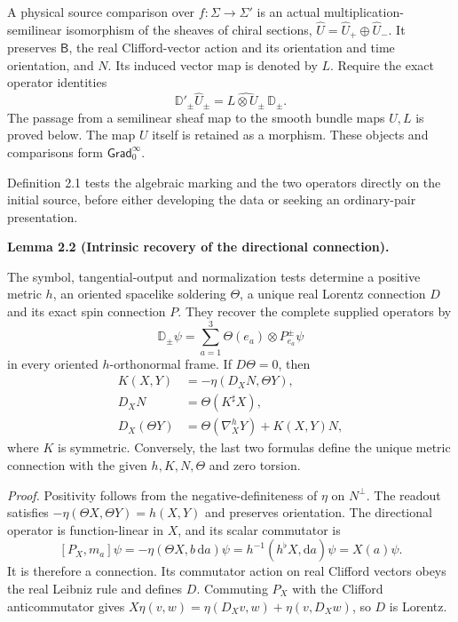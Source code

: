 \documentclass[
  english,
  11pt,
  reqno]{amsart}
\makeatletter
\newcommand{\pandocstatementheading}[1]{%
  \par\if@nobreak\else
    \addpenalty{\@beginparpenalty}%
    \addvspace{.5\baselineskip plus .2\baselineskip minus .2\baselineskip}%
  \fi
  {\normalfont\bfseries #1\par}%
  \nobreak\@afterindenttrue\@afterheading
}
\makeatother
\begin{document}
A physical source comparison over \(f:\Sigma\to\Sigma'\) is an actual
multiplication-semilinear isomorphism of the sheaves of chiral sections,
\(\widehat U=\widehat U_+\oplus\widehat U_-\). It preserves
\(\mathsf B\), the real Clifford-vector action and its orientation and
time orientation, and \(N\). Its induced vector map is denoted by \(L\).
Require the exact operator identities%
 \[
\mathbb D'_\pm\widehat U_\pm
=\widehat{L\otimes U_\pm}\,\mathbb D_\pm.
\] The passage from a semilinear sheaf map to the smooth bundle maps
\(U,L\) is proved below. The map \(U\) itself is retained as a morphism.
These objects and comparisons form \(\mathsf{Grad}_0^\infty\).

Definition 2.1 tests the algebraic marking and the two operators
directly on the initial source, before either developing the data or
seeking an ordinary-pair presentation.

\pandocstatementheading{\leavevmode{}\label{lem:online-intrinsic-gradient-decoder}Lemma 2.2 (Intrinsic recovery of the directional connection).}

The symbol, tangential-output and normalization tests determine a
positive metric \(h\), an oriented spacelike soldering \(\Theta\), a
unique real Lorentz connection \(D\) and its exact spin connection
\(P\). They recover the complete supplied operators by%
 \[
\mathbb D_\pm\psi
=\sum_{a=1}^3\Theta(e_a)\otimes P^\pm_{e_a}\psi
\] in every oriented \(h\)-orthonormal frame. If \(D\Theta=0\), then%
 \[
\begin{aligned}
K(X,Y)&=-\eta(D_XN,\Theta Y),\\
D_XN&=\Theta(K^\sharp X),\\
D_X(\Theta Y)&=\Theta(\nabla_X^hY)+K(X,Y)N,
\end{aligned}
\] where \(K\) is symmetric. Conversely, the last two formulas define
the unique metric connection with the given \(h,K,N,\Theta\) and zero
torsion.

\emph{Proof.} Positivity follows from the negative-definiteness of
\(\eta\) on \(N^\perp\). The readout satisfies
\(-\eta(\Theta X,\Theta Y)=h(X,Y)\) and preserves orientation. The
directional operator is function-linear in \(X\), and its scalar
commutator is \[
[P_X,m_a]\psi
=-\eta(\Theta X,b\,\mathrm da)\psi
=h^{-1}(h^\flat X,\mathrm da)\psi
=X(a)\psi.
\] It is therefore a connection. Its commutator action on real Clifford
vectors obeys the real Leibniz rule and defines \(D\). Commuting \(P_X\)
with the Clifford anticommutator gives
\(X\eta(v,w)=\eta(D_Xv,w)+\eta(v,D_Xw)\), so \(D\) is Lorentz.
\end{document}
